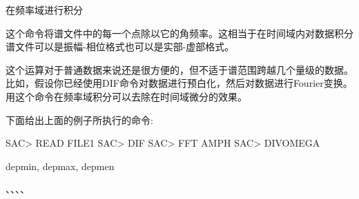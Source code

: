 \label{cmd:divomega}

在频率域进行积分

这个命令将谱文件中的每一个点除以它的角频率。这相当于在时间域内对数据积分谱文件可以是振幅-相位格式也可以是实部-虚部格式。

这个运算对于普通数据来说还是很方便的，但不适于谱范围跨越几个量级的数据。比如，假设你已经使用DIF命令对数据进行预白化，然后对数据进行Fourier变换。用这个命令在频率域积分可以去除在时间域微分的效果。

下面给出上面的例子所执行的命令:
\begin{SACCode}
SAC> READ FILE1
SAC> DIF
SAC> FFT AMPH
SAC> DIVOMEGA
\end{SACCode}

depmin, depmax, depmen

、、、、
